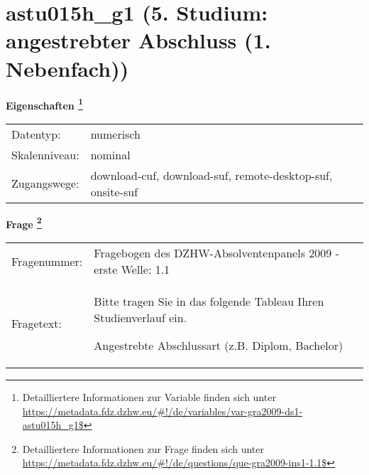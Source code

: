 
    \setcounter{footnote}{0}

    \vspace*{-1.8cm}
	\section{astu015h\_g1 (5. Studium: angestrebter Abschluss (1. Nebenfach))}
	\label{section:astu015h_g1}



    \vspace*{0.5cm}
    \noindent\textbf{Eigenschaften
	\footnote{Detailliertere Informationen zur Variable finden sich unter
		\url{https://metadata.fdz.dzhw.eu/\#!/de/variables/var-gra2009-ds1-astu015h_g1$}}}\\
	\begin{tabularx}{\hsize}{@{}lX}
	Datentyp: & numerisch \\
	Skalenniveau: & nominal \\
	Zugangswege: &
	  download-cuf, 
	  download-suf, 
	  remote-desktop-suf, 
	  onsite-suf
 \\
    \end{tabularx}



				\vspace*{0.5cm}
                \noindent\textbf{Frage
	                \footnote{Detailliertere Informationen zur Frage finden sich unter
		              \url{https://metadata.fdz.dzhw.eu/\#!/de/questions/que-gra2009-ins1-1.1$}}}\\
				\begin{tabularx}{\hsize}{@{}lX}
					Fragenummer: &
					  Fragebogen des DZHW-Absolventenpanels 2009 - erste Welle:
					  1.1
 \\
					Fragetext: & Bitte tragen Sie in das folgende Tableau Ihren Studienverlauf ein.\par  Angestrebte Abschlussart (z.B. Diplom, Bachelor) \\
				\end{tabularx}





